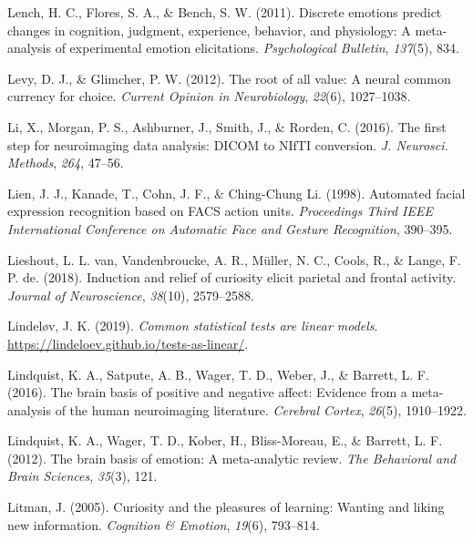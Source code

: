 \documentclass[11pt,american,a4paper,oneside,]{memoir} %
\begin{document}
\leavevmode\hypertarget{ref-lench2011discrete}{}%
Lench, H. C., Flores, S. A., \& Bench, S. W. (2011). Discrete emotions predict changes in cognition, judgment, experience, behavior, and physiology: A meta-analysis of experimental emotion elicitations. \emph{Psychological Bulletin}, \emph{137}(5), 834.

\leavevmode\hypertarget{ref-levy2012root}{}%
Levy, D. J., \& Glimcher, P. W. (2012). The root of all value: A neural common currency for choice. \emph{Current Opinion in Neurobiology}, \emph{22}(6), 1027--1038.

\leavevmode\hypertarget{ref-Li2016-ss}{}%
Li, X., Morgan, P. S., Ashburner, J., Smith, J., \& Rorden, C. (2016). The first step for neuroimaging data analysis: DICOM to NIfTI conversion. \emph{J. Neurosci. Methods}, \emph{264}, 47--56.

\leavevmode\hypertarget{ref-Lien1998-bg}{}%
Lien, J. J., Kanade, T., Cohn, J. F., \& Ching-Chung Li. (1998). Automated facial expression recognition based on FACS action units. \emph{Proceedings Third IEEE International Conference on Automatic Face and Gesture Recognition}, 390--395.

\leavevmode\hypertarget{ref-van2018induction}{}%
Lieshout, L. L. van, Vandenbroucke, A. R., Müller, N. C., Cools, R., \& Lange, F. P. de. (2018). Induction and relief of curiosity elicit parietal and frontal activity. \emph{Journal of Neuroscience}, \emph{38}(10), 2579--2588.

\leavevmode\hypertarget{ref-Lindelov2019-jk}{}%
Lindeløv, J. K. (2019). \emph{Common statistical tests are linear models}. \url{https://lindeloev.github.io/tests-as-linear/}.

\leavevmode\hypertarget{ref-lindquist2016brain}{}%
Lindquist, K. A., Satpute, A. B., Wager, T. D., Weber, J., \& Barrett, L. F. (2016). The brain basis of positive and negative affect: Evidence from a meta-analysis of the human neuroimaging literature. \emph{Cerebral Cortex}, \emph{26}(5), 1910--1922.

\leavevmode\hypertarget{ref-lindquist2012brain}{}%
Lindquist, K. A., Wager, T. D., Kober, H., Bliss-Moreau, E., \& Barrett, L. F. (2012). The brain basis of emotion: A meta-analytic review. \emph{The Behavioral and Brain Sciences}, \emph{35}(3), 121.

\leavevmode\hypertarget{ref-litman2005curiosity}{}%
Litman, J. (2005). Curiosity and the pleasures of learning: Wanting and liking new information. \emph{Cognition \& Emotion}, \emph{19}(6), 793--814.
\end{document}
